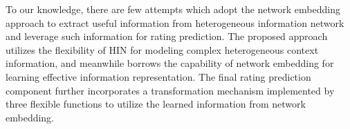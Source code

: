 To our knowledge, there are few attempts which adopt the network embedding approach to extract useful information from heterogeneous information network and leverage such information for rating prediction. The proposed approach utilizes the flexibility of HIN for modeling complex heterogeneous context information, and meanwhile borrows the capability of network embedding for learning effective information representation.
The final rating prediction component further incorporates a transformation mechanism implemented by three flexible functions to utilize the learned information from network embedding.
